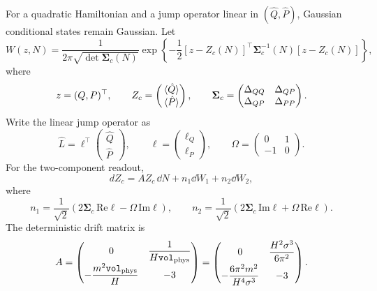 \documentclass{article}
\newcommand{\Vphys}{\mathtt{vol}_{\rm phys}}
\numberwithin{equation}{section}
\begin{document}
	For a quadratic Hamiltonian and a jump operator linear in \((\hat Q,\hat P)\), Gaussian conditional states remain Gaussian. Let
	\begin{equation}
		W(z,N)=\frac{1}{2\pi\sqrt{\det\mathbf{\Sigma}_c(N)}} \exp\left\{ -\frac12 \left[z-Z_c(N)\right]^\top \mathbf{\Sigma}_c^{-1}(N) \left[z-Z_c(N)\right] \right\},
	\end{equation}
	where
	\begin{equation}
		z=(Q,P)^\top, \qquad Z_c=\begin{pmatrix}\ev*{\hat Q}\\\ev*{\hat P}\end{pmatrix}, \qquad \mathbf{\Sigma}_c=
		\begin{pmatrix}
			\Delta_{QQ} & \Delta_{QP}\\ \Delta_{QP} & \Delta_{PP}
		\end{pmatrix}.
	\end{equation}
	Write the linear jump operator as
	\begin{equation}
		\hat L = \ell^\top
		\begin{pmatrix}\hat Q\\ \hat P\end{pmatrix},
		\qquad \ell=\begin{pmatrix}\ell_Q\\ \ell_P\end{pmatrix}, \qquad \Omega=\begin{pmatrix}0&1\\-1&0\end{pmatrix}.
	\end{equation}
	For the two-component readout,
	\begin{equation}
		dZ_c = A Z_c\,\dd N+n_1\dd W_1+n_2\dd W_2,
		\label{eq:appQSDcenter}
	\end{equation}
	where
	\begin{equation}
		n_1 = \frac{1}{\sqrt2} \left( 2\mathbf{\Sigma}_c\,\mathrm{Re}\ell - \Omega\,\mathrm{Im}\ell \right), \qquad n_2 = \frac{1}{\sqrt2} \left( 2\mathbf{\Sigma}_c\,\mathrm{Im}\ell + \Omega\,\mathrm{Re}\ell \right).
		\label{eq:appQSDnoiseVectors}
	\end{equation}
	The deterministic drift matrix is
	\begin{equation}
		A =
		\begin{pmatrix}
			0 & \dfrac{1}{H\Vphys}\\[6pt] -\dfrac{m^2\Vphys}{H} & -3
		\end{pmatrix}
		=
		\begin{pmatrix}
			0 & \dfrac{H^2\sigma^3}{6\pi^2}\\[6pt] -\dfrac{6\pi^2m^2}{H^4\sigma^3} & -3
		\end{pmatrix}.
	\end{equation}
\end{document}

